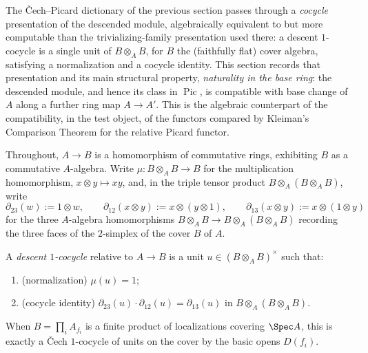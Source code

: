 The \v Cech--Picard dictionary of the previous section passes through a \emph{cocycle}
presentation of the descended module, algebraically equivalent to but more computable than
the trivializing-family presentation used there: a descent \(1\)-cocycle is a single unit of
\(B \otimes_A B\), for \(B\) the (faithfully flat) cover algebra, satisfying a normalization and
a cocycle identity. This section records that presentation and its main structural property,
\emph{naturality in the base ring}: the descended module, and hence its class in
\(\operatorname{Pic}\), is compatible with base change of \(A\) along a further ring map
\(A \to A'\). This is the algebraic counterpart of the compatibility, in the test object, of
the functors compared by Kleiman's Comparison Theorem for the relative Picard functor.

Throughout, \(A \to B\) is a homomorphism of commutative rings, exhibiting \(B\) as a
commutative \(A\)-algebra. Write \(\mu \colon B \otimes_A B \to B\) for the multiplication
homomorphism, \(x \otimes y \mapsto xy\), and, in the triple tensor product
\(B \otimes_A (B \otimes_A B)\), write
\[
  \partial_{23}(w) := 1 \otimes w, \qquad
  \partial_{12}(x \otimes y) := x \otimes (y \otimes 1), \qquad
  \partial_{13}(x \otimes y) := x \otimes (1 \otimes y)
\]
for the three \(A\)-algebra homomorphisms \(B \otimes_A B \to B \otimes_A (B \otimes_A B)\)
recording the three faces of the \(2\)-simplex of the cover \(B\) of \(A\).

\begin{definition}
  \label{def:module_descent_cocycle}
  \leanok
  A \emph{descent \(1\)-cocycle} relative to \(A \to B\) is a unit \(u \in (B \otimes_A
  B)^{\times}\) such that:
  \begin{enumerate}
    \item (normalization) \(\mu(u) = 1\);
    \item (cocycle identity) \(\partial_{23}(u) \cdot \partial_{12}(u) = \partial_{13}(u)\) in
      \(B \otimes_A (B \otimes_A B)\).
  \end{enumerate}
  When \(B = \prod_i A_{f_i}\) is a finite product of localizations covering \(\Spec A\), this
  is exactly a \v Cech \(1\)-cocycle of units on the cover by the basic opens \(D(f_i)\).
\end{definition}

